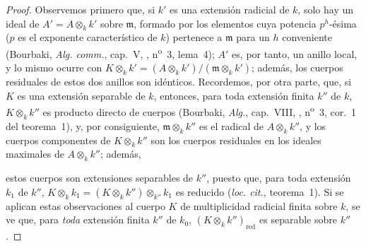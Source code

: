 \begin{proof}
Observemos primero que, si $k'$ es una extensión radicial de $k$, solo hay un
ideal de $A'=A\otimes_k k'$ sobre $\mathfrak m$, formado por los elementos
cuya potencia $p^h$-ésima ($p$ es el exponente característico de $k$) pertenece a
$\mathfrak m$ para un $h$ conveniente (Bourbaki, \emph{Alg. comm.}, cap.~V,
, n\textsuperscript{o}~3, lema~4); $A'$ es, por tanto, un anillo
local, y lo mismo ocurre con
$K\otimes_k k'=(A\otimes_k k')/(\mathfrak m\otimes_k k')$; además, los cuerpos
residuales de estos dos anillos son idénticos. Recordemos, por otra parte, que,
si $K$ es una extensión separable de $k$, entonces, para toda extensión finita
$k''$ de $k$, $K\otimes_k k''$ es producto directo de cuerpos (Bourbaki,
\emph{Alg.}, cap.~VIII, , n\textsuperscript{o}~3, cor.~1 del
teorema~1), y, por consiguiente, $\mathfrak m\otimes_k k''$ es el radical de
$A\otimes_k k''$, y los cuerpos componentes de $K\otimes_k k''$ son los cuerpos
residuales en los ideales maximales de $A\otimes_k k''$; además,


estos cuerpos son extensiones separables de $k''$, puesto que, para toda
extensión $k_1$ de $k''$,
$K\otimes_k k_1=(K\otimes_k k'')\otimes_{k''}k_1$ es reducido
(\emph{loc. cit.}, teorema~1). Si se aplican estas observaciones al cuerpo $K$ de
multiplicidad radicial finita sobre $k$, se ve que, para \emph{toda} extensión
finita $k''$ de $k_0$, $(K\otimes_k k'')_{\mathrm{red}}$ es separable sobre
$k''$.


\end{proof}
